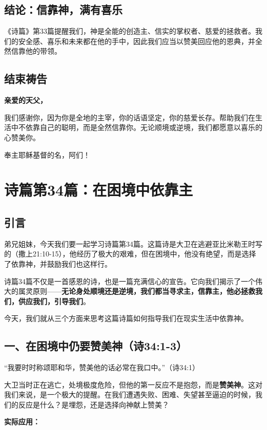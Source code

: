 \documentclass[a4paper, 12pt]{article}
\begin{document}
\subsection*{结论：信靠神，满有喜乐}
《诗篇》第33篇提醒我们，神是全能的创造主、信实的掌权者、慈爱的拯救者。我们的安全感、喜乐和未来都在他的手中，因此我们应当以赞美回应他的恩典，并全然信靠他的带领。

\subsection*{结束祷告}
\textbf{亲爱的天父，}

我们感谢你，因为你是全地的主宰，你的话语坚定，你的慈爱长存。帮助我们在生活中不依靠自己的聪明，而是全然信靠你。无论顺境或逆境，我们都愿意以喜乐的心赞美你。

奉主耶稣基督的名，阿们！
\newpage
\section{诗篇第34篇：在困境中依靠主}
\subsection*{引言}
\hspace{0.6cm}弟兄姐妹，今天我们要一起学习诗篇第34篇。这篇诗是大卫在逃避亚比米勒王时写的（撒上21:10-15），他经历了极大的艰难，但在困境中，他没有绝望，而是选择了依靠神，并鼓励我们也这样行。

诗篇34篇不仅是一首感恩的诗，也是一篇充满信心的宣告。它向我们揭示了一个伟大的属灵原则——\textbf{无论身处顺境还是逆境，我们都当寻求主，信靠主，他必拯救我们，供应我们，引导我们}。

今天，我们就从三个方面来思考这篇诗篇如何指导我们在现实生活中依靠神。
\subsection*{一、在困境中仍要赞美神（诗34:1-3）}
\hspace{0.6cm}“我要时时称颂耶和华，赞美他的话必常在我口中。”（诗34:1）

大卫当时正在逃亡，处境极度危险，但他的第一反应不是抱怨，而是\textbf{赞美神}。这对我们来说，是一个极大的提醒。在我们遭遇失败、困难、失望甚至逼迫的时候，我们的反应是什么？是埋怨，还是选择向神献上赞美？

\vspace{0.2cm}

\textbf{实际应用：}
\end{document}
